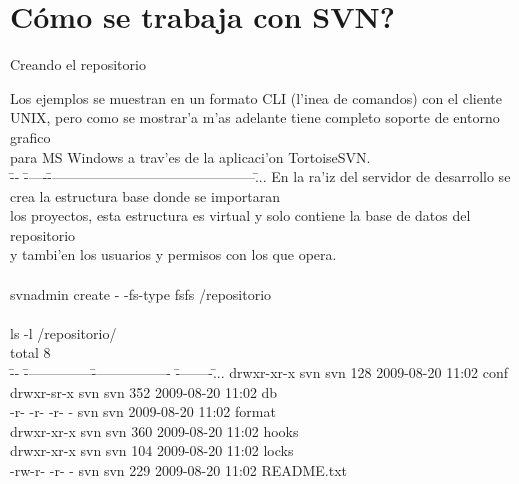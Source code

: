 \documentclass[xcolor=dvipsnames]{beamer}
\begin{document}
\section{C\'omo se trabaja con SVN?}	
	\begin{frame}{Creando el repositorio}
	\scriptsize
	{	            
	\begin{tabbing}
	Los ejemplos se muestran en un formato CLI (l'{i}nea de comandos) con el cliente \\
	UNIX, pero como se mostrar'a m'as adelante tiene completo soporte de entorno grafico \\
	para MS Windows a trav'es de la aplicaci'on TortoiseSVN.\\ 

	\= -- \= -----\= ---------------------------------------------\=  ... \kill
	\> En la ra'{i}z del servidor de desarrollo se crea la estructura base donde se importaran		\\
	\> los proyectos, esta estructura es virtual y solo contiene la base de datos del repositorio 	\\
	\> y tambi'en los usuarios y permisos con los que opera. \\ \\
	\>\> svnadmin create - -fs-type fsfs /repositorio		 \\	\\
	\>\> ls -l /repositorio/ \\
	\>\> total 8 \\
	\= -- \= ---------------\= ----------------- \= --------\= ... \kill
	\>\> drwxr-xr-x     svn svn 128 2009-08-20 11:02 conf \\
	\>\> drwxr-sr-x     svn svn 352 2009-08-20 11:02 db \\
	\>\> -r- -r- -r- -  svn svn  2009-08-20 11:02 format \\
	\>\> drwxr-xr-x     svn svn 360 2009-08-20 11:02 hooks \\
	\>\> drwxr-xr-x     svn svn 104 2009-08-20 11:02 locks \\
	\>\> -rw-r- -r- -   svn svn 229 2009-08-20 11:02 README.txt \\

	\end{tabbing}
	}
	\end{frame}
	
\end{document}
